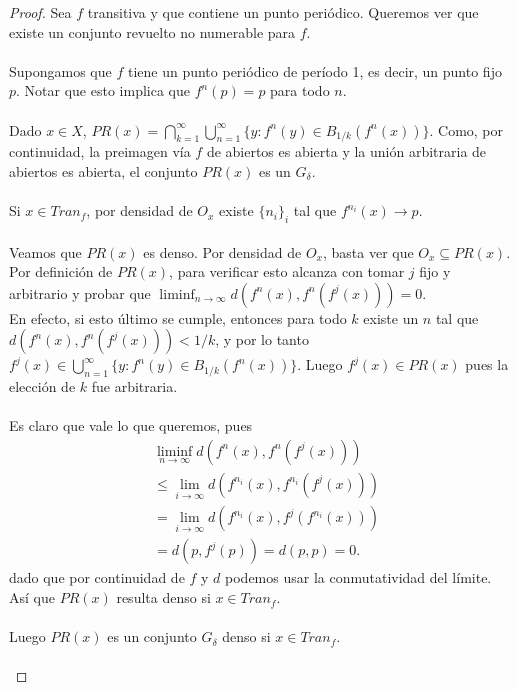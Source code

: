 \documentclass[12pt,a4paper]{article}
\begin{document}
\begin{proof}
Sea $f$ transitiva y que contiene un punto periódico. Queremos ver que existe un conjunto revuelto no numerable para $f$.
\\
\\
Supongamos que $f$ tiene un punto periódico de período 1, es decir, un punto fijo $p$. Notar que esto implica que $f^n(p) = p$ para todo $n$. 
\\
\\
Dado $x \in X$, $\displaystyle PR(x) = \bigcap_{k=1}^\infty \bigcup_{n=1}^\infty \{y:  f^n(y) \in B_{1/k}(f^n(x))\}$. Como, por continuidad, la preimagen vía $f$ de abiertos es abierta y la unión arbitraria de abiertos es abierta, el conjunto $PR(x)$ es un $G_\delta$.
\\
\\
Si $x \in \textit{Tran}_f$, por densidad de $O_x$ existe $\{n_i\}_i$ tal que $f^{n_i}(x) \rightarrow p$.
\\
\\
Veamos que $PR(x)$ es denso. Por densidad de $O_x$, basta ver que $O_x \subseteq PR(x)$. Por definición de $PR(x)$, para verificar esto alcanza con tomar $j$ fijo y arbitrario y probar que $\displaystyle \liminf_{n \rightarrow \infty} d(f^{n}(x), f^n(f^j(x))) = 0$.
\\
En efecto, si esto último se cumple, entonces para todo $k$ existe un $n$ tal que $d(f^{n}(x), f^n(f^j(x))) < 1/k$, y por lo tanto $\displaystyle f^j(x)\in \bigcup_{n=1}^\infty \{y: f^n(y) \in B_{1/k}(f^n(x))\}$. Luego $f^j(x)\in PR(x)$ pues la elección de $k$ fue arbitraria. 
\\
\\
Es claro que vale lo que queremos, pues
\begin{align*}
&\liminf_{n \rightarrow \infty} d(f^{n}(x), f^n(f^j(x))) \\
&\leq \lim_{i \rightarrow \infty} d(f^{n_i}(x), f^{n_i}(f^j(x))) \\
& = \lim_{i \rightarrow \infty} d(f^{n_i}(x), f^{j}(f^{n_i}(x))) \\
&= d(p,f^j(p)) = d(p, p) = 0.
\end{align*}
dado que por continuidad de $f$ y $d$ podemos usar la conmutatividad del límite.
\\
Así que $PR(x)$ resulta denso si $x \in \textit{Tran}_f$.
\\
\\
Luego $PR(x)$ es un conjunto $G_\delta$ denso si $x \in \textit{Tran}_f$.
\\
\\

\end{proof}
\end{document}
